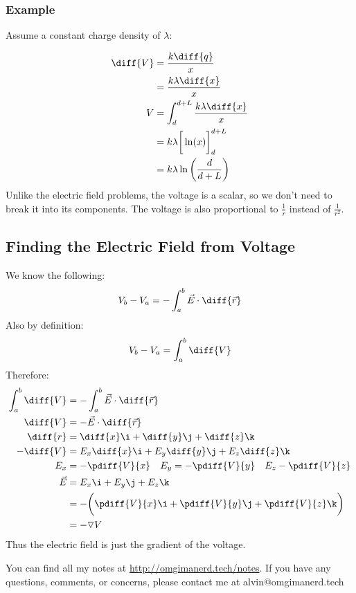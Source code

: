 \documentclass{math}
\begin{document}
\subsubsection*{Example}
Assume a constant charge density of \( \lambda \):
\begin{center}
\end{center}
\begin{align*}
  \diff{V} &= \frac{k\diff{q}}{x} \\
  &= \frac{k\lambda\diff{x}}{x} \\
  V &= \int_{d}^{d+L}\frac{k\lambda\diff{x}}{x} \\
  &= k\lambda\bigg[\ln(x)\bigg]_{d}^{d+L} \\
  &= k\lambda\ln\bigg(\frac{d}{d+L}\bigg)
\end{align*}
Unlike the electric field problems, the voltage is a scalar, so we don't need
to break it into its components. The voltage is also proportional to
\( \frac{1}{r} \) instead of \( \frac{1}{r^2} \).

\subsection*{Finding the Electric Field from Voltage}
We know the following:
\[ V_b-V_a = -\int_{a}^{b}\vec{E}\cdot\diff{\vec{r}} \]
Also by definition:
\[ V_b-V_a = \int_{a}^{b}\diff{V} \]
Therefore:
\begin{align*}
  \int_{a}^{b}\diff{V} &= -\int_{a}^{b}\vec{E}\cdot\diff{\vec{r}} \\
  \diff{V} &= -\vec{E}\cdot\diff{\vec{r}} \\
  \diff{r} &= \diff{x}\i+\diff{y}\j+\diff{z}\k \\
  -\diff{V} &= E_x\diff{x}\i+E_y\diff{y}\j+E_z\diff{z}\k \\
  E_x &= -\pdiff{V}{x} \quad E_y = -\pdiff{V}{y} \quad E_z -\pdiff{V}{z} \\
  \vec{E} &= E_x\i+E_y\j+E_z\k \\
  &= -\bigg(\pdiff{V}{x}\i+\pdiff{V}{y}\j+\pdiff{V}{z}\k\bigg) \\
  &= -\triangledown V
\end{align*}
Thus the electric field is just the gradient of the voltage.

\begin{center}
  You can find all my notes at \url{http://omgimanerd.tech/notes}. If you have
  any questions, comments, or concerns, please contact me at
  alvin@omgimanerd.tech
\end{center}
\end{document}
